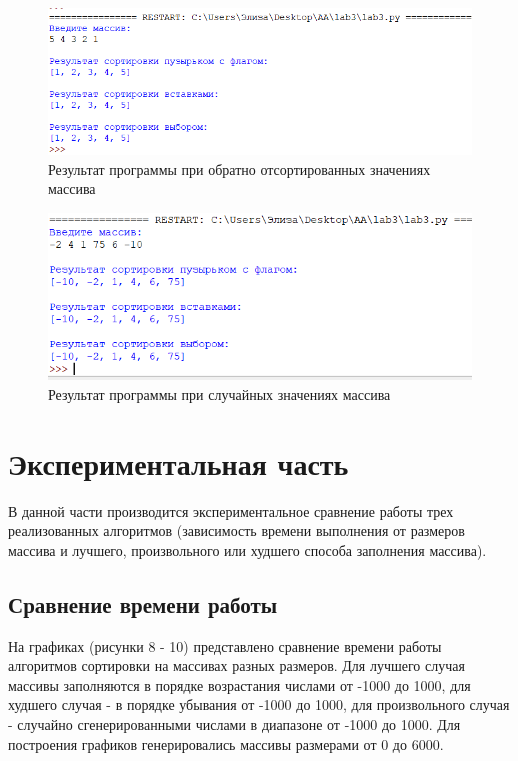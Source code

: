 \documentclass[a4paper,12pt]{article}
\begin{document}
	\begin{figure}[H]
		\centering
		\includegraphics{res3.png}
		\captionsetup{justification=centering}
		\caption{Результат программы при обратно отсортированных значениях массива}
		\label{Рис 6}
	\end{figure}

	\begin{figure}[H]
		\centering
		\includegraphics{res4.png}
		\captionsetup{justification=centering}
		\caption{Результат программы при случайных значениях массива}
		\label{Рис 7}
	\end{figure}

    
    
    \newpage

	\section{Экспериментальная часть}
	\hfill
	
	В данной части производится экспериментальное сравнение работы трех реализованных алгоритмов (зависимость времени выполнения от размеров массива и лучшего, произвольного или худшего способа заполнения массива).
	
	\subsection{Сравнение времени работы}	
	\hfill
	
	На графиках (рисунки 8 - 10) представлено сравнение времени работы алгоритмов сортировки на массивах разных размеров. Для лучшего случая массивы заполняются в порядке возрастания числами от -1000 до 1000, для худшего случая - в порядке убывания от -1000 до 1000, для произвольного случая - случайно сгенерированными числами в диапазоне от -1000 до 1000. Для построения графиков генерировались массивы размерами от 0 до 6000.
	
\end{document}
